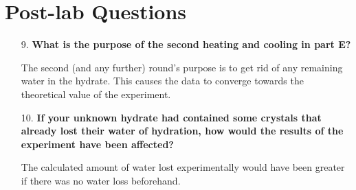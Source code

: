 \documentclass{article}
\begin{document}
\section{Post-lab Questions}

\begin{enumerate}
    \item[9.] \textbf{What is the purpose of the second heating and cooling in part E?}

        The second (and any further) round's purpose is to get rid of any remaining water in the hydrate. This causes the data to converge towards the theoretical value of the experiment.

    \item[10.] \textbf{If your unknown hydrate had contained some crystals that already lost their water of hydration, how would the results of the experiment have been affected?}

        The calculated amount of water lost experimentally would have been greater if there was no water loss beforehand.
\end{enumerate}
\end{document}
